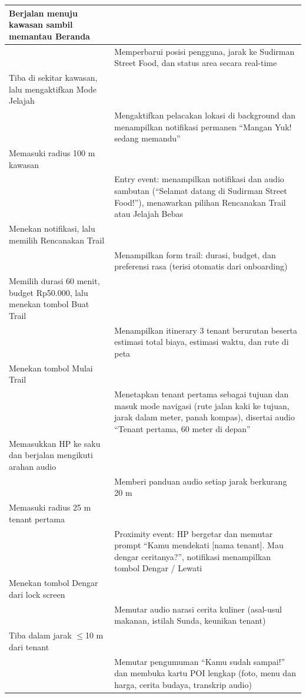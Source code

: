 \begin{longtable}{|L{0.500}|L{0.500}|}
Berjalan menuju kawasan sambil memantau Beranda &  \\ \hline
 & Memperbarui posisi pengguna, jarak ke Sudirman Street Food, dan status area secara real-time \\ \hline
Tiba di sekitar kawasan, lalu mengaktifkan Mode Jelajah &  \\ \hline
 & Mengaktifkan pelacakan lokasi di background dan menampilkan notifikasi permanen ``Mangan Yuk! sedang memandu'' \\ \hline
Memasuki radius 100 m kawasan &  \\ \hline
 & Entry event: menampilkan notifikasi dan audio sambutan (``Selamat datang di Sudirman Street Food!''), menawarkan pilihan Rencanakan Trail atau Jelajah Bebas \\ \hline
Menekan notifikasi, lalu memilih Rencanakan Trail &  \\ \hline
 & Menampilkan form trail: durasi, budget, dan preferensi rasa (terisi otomatis dari onboarding) \\ \hline
Memilih durasi 60 menit, budget Rp50.000, lalu menekan tombol Buat Trail &  \\ \hline
 & Menampilkan itinerary 3 tenant berurutan beserta estimasi total biaya, estimasi waktu, dan rute di peta \\ \hline
Menekan tombol Mulai Trail &  \\ \hline
 & Menetapkan tenant pertama sebagai tujuan dan masuk mode navigasi (rute jalan kaki ke tujuan, jarak dalam meter, panah kompas), disertai audio ``Tenant pertama, 60 meter di depan'' \\ \hline
Memasukkan HP ke saku dan berjalan mengikuti arahan audio &  \\ \hline
 & Memberi panduan audio setiap jarak berkurang 20 m \\ \hline
Memasuki radius 25 m tenant pertama &  \\ \hline
 & Proximity event: HP bergetar dan memutar prompt ``Kamu mendekati [nama tenant]. Mau dengar ceritanya?'', notifikasi menampilkan tombol Dengar / Lewati \\ \hline
Menekan tombol Dengar dari lock screen &  \\ \hline
 & Memutar audio narasi cerita kuliner (asal-usul makanan, istilah Sunda, keunikan tenant) \\ \hline
Tiba dalam jarak \(\le\)10 m dari tenant &  \\ \hline
 & Memutar pengumuman ``Kamu sudah sampai!'' dan membuka kartu POI lengkap (foto, menu dan harga, cerita budaya, transkrip audio) \\ \hline

\end{longtable}
